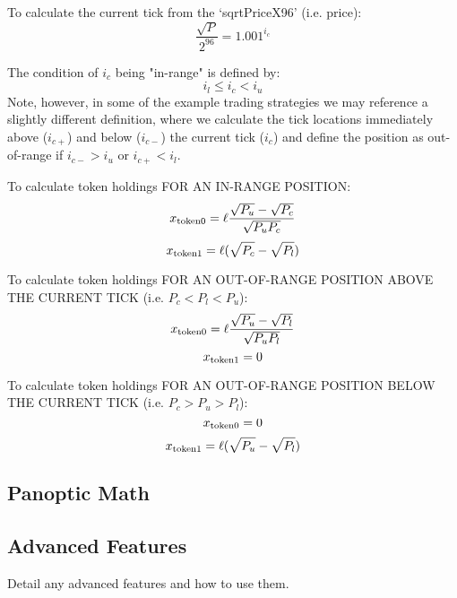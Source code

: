 \documentclass[aps,preprint]{revtex4-1}
\begin{document}
To calculate the current tick from the `sqrtPriceX96' (i.e. price): 
\begin{equation}
    \frac{\sqrt{P}}{2^{96}} = 1.001^{i_c}
\end{equation}

The condition of $i_c$ being "in-range" is defined by: 
\begin{equation}
    i_l \leq i_c < i_u
\end{equation}
Note, however, in some of the example trading strategies we may reference a slightly different definition, 
where we calculate the tick locations immediately above ($i_{c+}$) and below ($i_{c-}$) the current tick 
($i_c$) and define the position as out-of-range if $i_{c-} > i_u$ or $i_{c+} < i_l$. 


To calculate token holdings FOR AN IN-RANGE POSITION: 
\begin{equation}
    x_{\rm token0} = \ell \frac{\sqrt{P_u} - \sqrt{P_c}}{\sqrt{P_u P_c}}
\end{equation}
\begin{equation}
    x_{\rm token1} = \ell (\sqrt{P_c}-\sqrt{P_l})
\end{equation}

To calculate token holdings FOR AN OUT-OF-RANGE POSITION ABOVE THE CURRENT TICK (i.e. $P_c < P_l < P_u$):
\begin{equation}
    x_{\rm token0} = \ell \frac{\sqrt{P_u} - \sqrt{P_l}}{\sqrt{P_u P_l}}
\end{equation}
\begin{equation}
    x_{\rm token1} = 0
\end{equation}

To calculate token holdings FOR AN OUT-OF-RANGE POSITION BELOW THE CURRENT TICK (i.e. $P_c > P_u > P_l$):
\begin{equation}
    x_{\rm token0} = 0
\end{equation}
\begin{equation}
    x_{\rm token1} = \ell (\sqrt{P_u}-\sqrt{P_l})
\end{equation}

\subsection{Panoptic Math}

\subsection{Advanced Features}
Detail any advanced features and how to use them.
\end{document}
